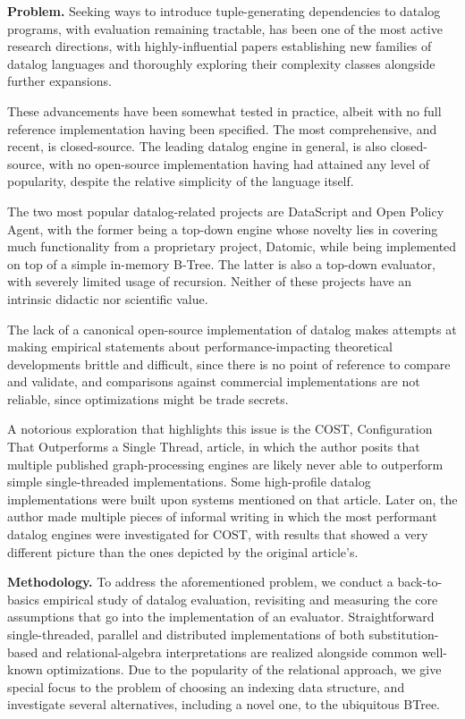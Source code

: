 \textbf{Problem.} Seeking ways to introduce tuple-generating dependencies to datalog
programs, with evaluation remaining tractable, has been one of the most active research
directions, with highly-influential papers establishing new families of datalog languages\cite{datalog_plus_minus}
and thoroughly exploring their complexity classes alongside further expansions\cite{sticky,warded,monadic}.

These advancements have been somewhat tested in practice, albeit with no full reference implementation having
been specified. The most comprehensive, and recent, is closed-source\cite{vadalog}. The
leading datalog engine in general, is also closed-source\cite{rdfox}, with no open-source
implementation having had attained any level of popularity, despite the relative simplicity
of the language itself.

The two most popular datalog-related projects are DataScript\cite{datascript} and
Open Policy Agent\cite{opa}, with the former being a top-down engine whose novelty lies in
covering much functionality from a proprietary project, Datomic\cite{datomic}, while being
implemented on top of a simple in-memory B-Tree. The latter is also a top-down evaluator,
with severely limited usage of recursion. Neither of these projects have an intrinsic didactic
nor scientific value.

The lack of a canonical open-source implementation of datalog makes attempts at making
empirical statements about performance-impacting theoretical developments brittle and
difficult, since there is no point of reference to compare and validate, and comparisons
against commercial implementations are not reliable, since optimizations might be trade secrets.

A notorious exploration that highlights this issue is the COST, Configuration That Outperforms
a Single Thread, article\cite{COST}, in which the author posits that multiple published
graph-processing engines are likely never able to outperform simple single-threaded implementations.
Some high-profile datalog implementations were built upon systems mentioned on that article.
Later on, the author made multiple pieces of informal writing in which the most performant datalog
engines were investigated for COST\cite{blogdynamicdatalog, blogvldbsigmod}, with results that
showed a very different picture than the ones depicted by the original article's.

\textbf{Methodology.} To address the aforementioned problem, we conduct a back-to-basics
empirical study of datalog evaluation, revisiting and measuring the core assumptions that go
into the implementation of an evaluator. Straightforward single-threaded, parallel and distributed
implementations of both substitution-based and relational-algebra interpretations are realized alongside common
well-known optimizations. Due to the popularity of the relational approach, we give special focus
to the problem of choosing an indexing data structure, and investigate several alternatives, including
a novel one, to the ubiquitous BTree.

